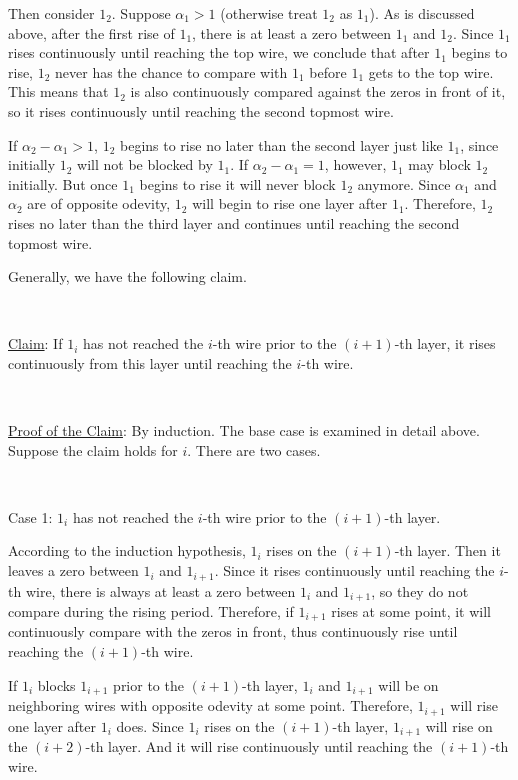 \documentclass{article}
\begin{document}
Then consider $1_2$. Suppose $\alpha_1>1$ (otherwise treat $1_2$ as $1_1$). As is discussed above, after the first rise of $1_1$, there is at least a zero between $1_1$ and $1_2$. Since $1_1$ rises continuously until reaching the top wire, we conclude that after $1_1$ begins to rise, $1_2$ never has the chance to compare with $1_1$ before $1_1$ gets to the top wire. This means that $1_2$ is also continuously compared against the zeros in front of it, so it rises continuously until reaching the second topmost wire.

If $\alpha_2-\alpha_1>1$, $1_2$ begins to rise no later than the second layer just like $1_1$, since initially $1_2$ will not be blocked by $1_1$. If $\alpha_2-\alpha_1=1$, however, $1_1$ may block $1_2$ initially. But once $1_1$ begins to rise it will never block $1_2$ anymore. Since $\alpha_1$ and $\alpha_2$ are of opposite odevity, $1_2$ will begin to rise one layer after $1_1$. Therefore, $1_2$ rises no later than the third layer and continues until reaching the second topmost wire.

Generally, we have the following claim.

~

\noindent\underline{Claim}: If $1_i$ has not reached the $i$-th wire prior to the $(i+1)$-th layer, it rises continuously from this layer until reaching the $i$-th wire.

~

\noindent\underline{Proof of the Claim}: By induction. The base case is examined in detail above. Suppose the claim holds for $i$. There are two cases.

~

\noindent Case 1: $1_i$ has not reached the $i$-th wire prior to the $(i+1)$-th layer.

According to the induction hypothesis, $1_i$ rises on the $(i+1)$-th layer. Then it leaves a zero between $1_i$ and $1_{i+1}$. Since it rises continuously until reaching the $i$-th wire, there is always at least a zero between $1_i$ and $1_{i+1}$, so they do not compare during the rising period. Therefore, if $1_{i+1}$ rises at some point, it will continuously compare with the zeros in front, thus continuously rise until reaching the $(i+1)$-th wire.

If $1_i$ blocks $1_{i+1}$ prior to the $(i+1)$-th layer, $1_i$ and $1_{i+1}$ will be on neighboring wires with opposite odevity at some point. Therefore, $1_{i+1}$ will rise one layer after $1_i$ does. Since $1_i$ rises on the $(i+1)$-th layer, $1_{i+1}$ will rise on the $(i+2)$-th layer. And it will rise continuously until reaching the $(i+1)$-th wire.
\end{document}
